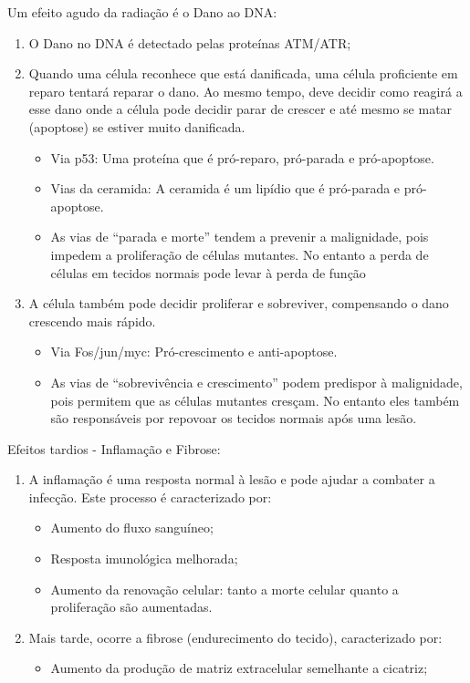 \documentclass[11pt,a4paper]{article}
\begin{document}
	Um efeito agudo da radiação é o Dano ao DNA:

		\begin{enumerate}
			\item O Dano no DNA é detectado pelas proteínas ATM/ATR;
			\item Quando uma célula reconhece que está danificada, uma célula proficiente em reparo tentará reparar o dano. Ao mesmo tempo, deve decidir como reagirá a esse dano onde a célula pode decidir parar de crescer e até mesmo se matar (apoptose) se estiver muito danificada.
				\begin{itemize}
					\item Via p53: Uma proteína que é pró-reparo, pró-parada e pró-apoptose.
					\item Vias da ceramida: A ceramida é um lipídio que é pró-parada e pró-apoptose.
					\item As vias de “parada e morte” tendem a prevenir a malignidade, pois impedem a proliferação de células mutantes. No entanto a perda de células em tecidos normais pode levar à perda de função
				\end{itemize}
			\item A célula também pode decidir proliferar e sobreviver, compensando o dano crescendo mais rápido.
				\begin{itemize}
					\item Via Fos/jun/myc: Pró-crescimento e anti-apoptose.
					\item As vias de “sobrevivência e crescimento” podem predispor à malignidade, pois permitem que as células mutantes cresçam. No entanto eles também são responsáveis por repovoar os tecidos normais após uma lesão.
				\end{itemize}

		\end{enumerate}

	Efeitos tardios - Inflamação e Fibrose:

		\begin{enumerate}
			\item A inflamação é uma resposta normal à lesão e pode ajudar a combater a infecção. Este processo é caracterizado por:
				\begin{itemize}
					\item Aumento do fluxo sanguíneo;
					\item Resposta imunológica melhorada;
					\item Aumento da renovação celular: tanto a morte celular quanto a proliferação são aumentadas.
				\end{itemize}

			\item Mais tarde, ocorre a fibrose (endurecimento do tecido), caracterizado por:
				\begin{itemize}
					\item Aumento da produção de matriz extracelular semelhante a cicatriz;
				\end{itemize}
		\end{enumerate}


\end{document}
